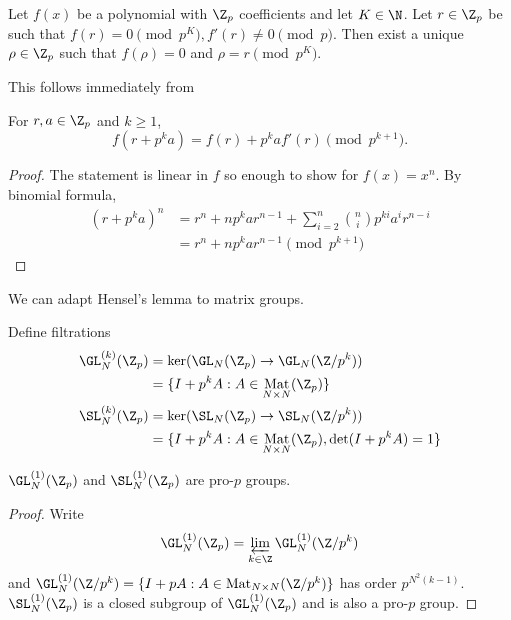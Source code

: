 \documentclass[a4paper]{article}
\DeclareMathOperator{\Mat}{Mat} %
\begin{document}
\begin{proposition}
  Let \(f(x)\) be a polynomial with \(\Z_p\) coefficients and let \(K \in \N\). Let \(r \in \Z_p\) be such that \(f(r) = 0 \pmod{p^K}, f'(r) \ne 0 \pmod p\). Then exist a unique \(\rho \in \Z_p\) such that \(f(\rho) = 0\) and \(\rho = r \pmod{p^K}\).
\end{proposition}

This follows immediately from

\begin{lemma}
  For \(r, a \in \Z_p\) and \(k \geq 1\),
  \[
    f(r + p^ka) = f(r) + p^k af'(r) \pmod{p^{k + 1}}.
  \]
\end{lemma}

\begin{proof}
  The statement is linear in \(f\) so enough to show for \(f(x) = x^n\). By binomial formula,
  \begin{align*}
    (r + p^ka)^n
    &= r^n + np^ka r^{n - 1} + \sum_{i = 2}^n \binom{n}{i} p^{ki}a^i r^{n - i} \\
    &= r^n + np^kar^{n - 1} \pmod{p^{k + 1}}
  \end{align*}
\end{proof}

We can adapt Hensel's lemma to matrix groups.

\begin{definition}
  Define filtrations
  \begin{align*}
    \GL_N^{(k)}(\Z_p)
    &= \ker(\GL_N(\Z_p) \to \GL_N(\Z/p^k)) \\
    &= \{I + p^k A: A \in \Mat_{N \times N}(\Z_p)\} \\
    \SL_N^{(k)}(\Z_p)
    &= \ker(\SL_N(\Z_p) \to \SL_N(\Z/p^k)) \\
    &= \{I + p^k A: A \in \Mat_{N \times N}(\Z_p), \det(I + p^kA) = 1\}
  \end{align*}
\end{definition}

\begin{proposition}
  \(\GL_N^{(1)}(\Z_p)\) and \(\SL_N^{(1)}(\Z_p)\) are pro-\(p\) groups.
\end{proposition}

\begin{proof}
  Write
  \[
    \GL_N^{(1)}(\Z_p) = \varprojlim_{k \in \Z} \GL_N^{(1)}(\Z/p^k)
  \]
  and \(\GL_N^{(1)}(\Z/p^k) = \{I + pA: A \in \Mat_{N \times N}(\Z/p^k)\}\) has order \(p^{N^2(k - 1)}\). \(\SL_N^{(1)}(\Z_p)\) is a closed subgroup of \(\GL_N^{(1)}(\Z_p)\) and is also a pro-\(p\) group.
\end{proof}
\end{document}
